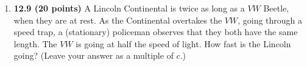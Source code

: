 \documentclass[fleqn]{article}
\begin{document}
\begin{enumerate}
{        \\
        $
          \beta \equiv \dfrac{v}{c} \approxeq 1
          \\
          \\
          \text{For lecture we had } \beta=1-\epsilon, \text{assuming } \epsilon \text{is very very small.}
          \\
          \\
          \\
          \dfrac{-1+\sqrt{1+15 (1-\epsilon)^2}}{3 (1-\epsilon)}
          =\dfrac{-1+\sqrt{1+15 (1-\epsilon)^2}}{3} (1+\epsilon)
          =\dfrac{-1+\sqrt{16-30 \epsilon}}{3} (1+\epsilon)
          \\
          \\
          \\
          =(1-\dfrac{5}{4} \epsilon) (1+\epsilon)
          =1-\dfrac{1}{4} \epsilon
          \\
          \\
          \\
          \therefore ~~~ \theta_{max} \approxeq 0 \Longrightarrow cos \theta_{max} \approxeq1-\dfrac{1}{4} \theta^2_{max}
          \\
          \\
          \\
          \Longrightarrow \theta_{max}=\sqrt{\dfrac{\epsilon}{2}}
          \\
          \\
          \\
          \therefore ~~~ \boxed{
            \theta_{max}=\sqrt{\dfrac{(1-\beta)}{2}}
          } ~~~~ \checkmark
          \\
          \\
        $
      }

    \item \textbf{12.9 (20 points)} A Lincoln Continental is twice as long as a $VW$ Beetle, when they
    are at rest. As the Continental overtakes the $VW$, going through a speed trap, a
    (stationary) policeman observes that they both have the same length. The $VW$ is
    going at half the speed of light. How fast is the Lincoln going? (Leave your answer
    as a multiple of $c$.)


\end{enumerate}
\end{document}

